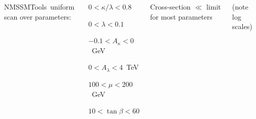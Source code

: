 \documentclass[compress]{beamer}
\begin{document}
\begin{frame}
\begin{columns}

\mbox{NMSSMTools uniform\hspace{-0.5 cm}} scan over parameters:
\begin{center}
$0 < \kappa/\lambda < 0.8$

\vspace{0.1 cm}
$0 < \lambda < 0.1$

\vspace{0.1 cm}
$-0.1 < A_\kappa < 0$~GeV

\vspace{0.1 cm}
$0 < A_\lambda < 4$~TeV

\vspace{0.1 cm}
$100 < \mu < 200$~GeV

\vspace{0.1 cm}
$10 < \tan\beta < 60$
\end{center}

\vspace{0.3 cm}
Cross-section $\ll$ limit for most parameters

\vspace{0.3 cm}
(note log scales)
\end{columns}
\end{frame}
\end{document}
